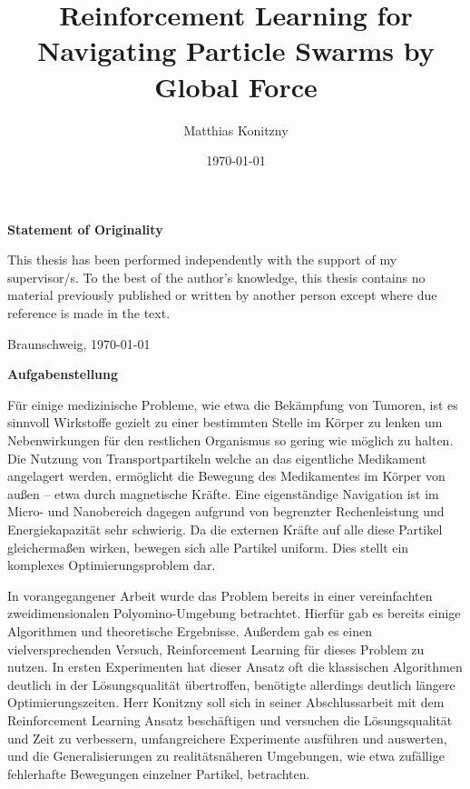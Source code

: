 \documentclass[%
  a4paper,%
  11pt,%
  style=print,
  blue,%
  bibliography=totoc,
  nexus,
  lnum,
  extramargin,
  table
  ]{tubsbook}
\title{Reinforcement Learning for Navigating Particle Swarms by Global Force}
\author{Matthias Konitzny}
\date{\today}
\begin{document}
\maketitle

\frontmatter

\cleardoublepage


\thispagestyle{plain} %
\vspace*{7cm}
\centerline{\bfseries Statement of Originality}
\vspace*{1em}
\noindent
This thesis has been performed independently with the support of my supervisor/s.
To the best of the author's knowledge, this thesis contains no material previously
published or written by another person except where due reference is made in the text.

\par
  \bigskip\noindent Braunschweig, \today \par
  \vspace*{10mm}
  \hfill\hrulefill
\cleardoublepage

\thispagestyle{plain} %
\centerline{\bfseries Aufgabenstellung}
\vspace*{1em}
\noindent
Für einige medizinische Probleme, wie etwa die Bekämpfung von Tumoren, ist es sinnvoll Wirkstoffe gezielt zu einer bestimmten Stelle im Körper zu lenken um Nebenwirkungen für den restlichen Organismus so gering wie möglich zu halten. Die Nutzung von Transportpartikeln welche an das eigentliche Medikament angelagert werden, ermöglicht die Bewegung des Medikamentes im Körper von außen -- etwa durch magnetische Kräfte. Eine eigenständige Navigation ist im Micro- und Nanobereich dagegen aufgrund von begrenzter Rechenleistung und Energiekapazität sehr schwierig. Da die externen Kräfte auf alle diese Partikel gleichermaßen wirken, bewegen sich alle Partikel uniform. Dies stellt ein komplexes Optimierungsproblem dar.

In vorangegangener Arbeit wurde das Problem bereits in einer vereinfachten zweidimensionalen Polyomino-Umgebung betrachtet. Hierfür gab es bereits einige Algorithmen und theoretische Ergebnisse. Außerdem gab es einen vielversprechenden Versuch, Reinforcement Learning für dieses Problem zu nutzen. In ersten Experimenten hat dieser Ansatz oft die klassischen Algorithmen deutlich in der Lösungsqualität übertroffen, benötigte allerdings deutlich längere Optimierungszeiten. Herr Konitzny soll sich in seiner Abschlussarbeit mit dem Reinforcement Learning Ansatz beschäftigen und versuchen die Lösungsqualität und Zeit zu verbessern, umfangreichere Experimente ausführen und auswerten, und die Generalisierungen zu realitätsnäheren Umgebungen, wie etwa zufällige fehlerhafte Bewegungen einzelner Partikel, betrachten.
\cleardoublepage
\end{document}

